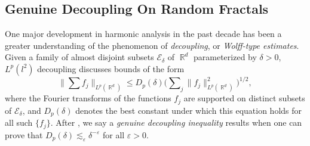 \documentclass[11pt]{article}
\DeclareMathOperator{\RR}{\mathbb{R}}
\begin{document}
%
%

\subsection{Genuine Decoupling On Random Fractals}

One major development in harmonic analysis in the past decade has been a greater understanding of the phenomenon of \emph{decoupling}, or \emph{Wolff-type estimates}. Given a family of almost disjoint subsets $\mathcal{E}_\delta$ of $\RR^d$ parameterized by $\delta > 0$, $L^p(l^2)$ decoupling discusses bounds of the form
%
\[ \Big\| \sum f_j \Big\|_{L^p(\RR^d)} \leq D_p(\delta) \Big( \sum\nolimits_j \| f_j \|_{L^p(\RR^d)}^2 \Big)^{1/2}, \]
%
where the Fourier transforms of the functions $f_j$ are supported on distinct subsets of $\mathcal{E}_\delta$, and $D_p(\delta)$ denotes the best constant under which this equation holds for all such $\{ f_j \}$. After \cite{DemeterBook}, we say a \emph{genuine decoupling inequality} results when one can prove that $D_p(\delta) \lesssim_\varepsilon \delta^{-\varepsilon}$ for all $\varepsilon > 0$.%
\end{document}
